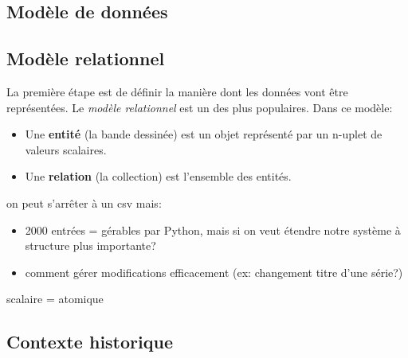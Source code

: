 \documentclass[a4paper,11pt]{article}
\begin{document}
\begin{Form}
\section{Modèle de données}
\subsection{Modèle relationnel}
La première étape est de définir la manière dont les données vont être représentées. Le \emph{modèle relationnel} est un des plus populaires. Dans ce modèle:
\begin{itemize}
\item Une \textbf{entité} (la bande dessinée) est un objet représenté par un n-uplet de valeurs scalaires.
\item Une \textbf{relation} (la collection) est l'ensemble des entités.
\end{itemize}
\begin{commentprof}
on peut s'arrêter à un csv mais:
\begin{itemize}
\item 2000 entrées = gérables par Python, mais si on veut étendre notre système à structure plus importante?
\item comment gérer modifications efficacement (ex: changement titre d'une série?)
\end{itemize}
scalaire = atomique
\subsection{Contexte historique}

\end{commentprof}

\end{Form}
\end{document}

